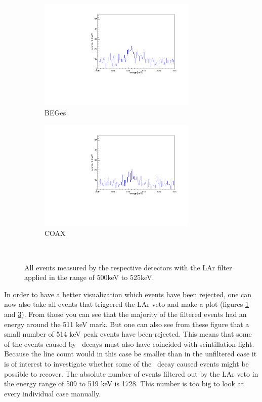\documentclass[encoding=utf8,british]{tumphthesis}
\begin{document}
\begin{figure}[t!]
	\centering
	\begin{subfigure}{.5\textwidth}
		\includegraphics[width=75mm]{./Bilder/AntiLArBEGe.pdf}
		\caption{BEGes}
		\label{fig:AntiLArBEGes}
	\end{subfigure}\hfill%
	\begin{subfigure}{.5\textwidth}
		\includegraphics[width=75mm]{./Bilder/AntiLArCOAX.pdf}
		\caption{COAX}
		\label{fig:AntiLArCOAX}
	\end{subfigure}
	\\
	\vspace{0.5cm}
	\caption{All events measured by the respective detectors with the LAr filter applied in the range of 500keV to 525keV.}
\end{figure}

In order to have a better visualization which events have been rejected, one can now also take all events that triggered the LAr veto and make a plot (figures \ref{fig:AntiLArBEGes} and \ref{fig:AntiLArCOAX}).
From those you can see that the majority of the filtered events had an energy around the 511 keV mark.
But one can also see from these figure that a small number of 514 keV peak events have been rejected.
This means that some of the events caused by \Kr\ decays must also have coincided with scintillation light.
\\

Because the line count would in this case be smaller than in the unfiltered case it is of interest to investigate whether some of the \Kr\ decay caused events might be possible to recover.
The absolute number of events filtered out by the LAr veto in the energy range of 509 to 519 keV is 1728.
This number is too big to look at every individual case manually.
\\
\end{document}
